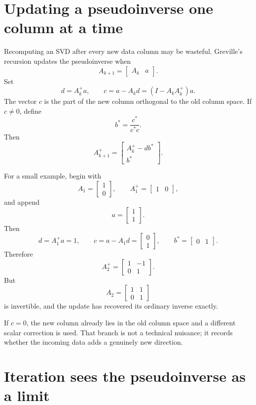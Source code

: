 \section{Updating a pseudoinverse one column at a time}

Recomputing an SVD after every new data column may be wasteful.  Greville's recursion updates the pseudoinverse when
\[
  A_{k+1}=\begin{bmatrix}A_k&a\end{bmatrix}.
\]
Set
\[
  d=A_k^+a,
  \qquad
  c=a-A_kd=(I-A_kA_k^+)a.
\]
The vector \(c\) is the part of the new column orthogonal to the old column space.  If \(c\ne0\), define
\[
  b^*=\frac{c^*}{c^*c}.
\]
Then
\[
  A_{k+1}^+
  =
  \begin{bmatrix}
    A_k^+-db^*\\
    b^*
  \end{bmatrix}.
\]

For a small example, begin with
\[
  A_1=
  \begin{bmatrix}1\\0\end{bmatrix},
  \qquad
  A_1^+=\begin{bmatrix}1&0\end{bmatrix},
\]
and append
\[
  a=
  \begin{bmatrix}1\\1\end{bmatrix}.
\]
Then
\[
  d=A_1^+a=1,
  \qquad
  c=a-A_1d=
  \begin{bmatrix}0\\1\end{bmatrix},
  \qquad
  b^*=\begin{bmatrix}0&1\end{bmatrix}.
\]
Therefore
\[
  A_2^+
  =
  \begin{bmatrix}
    1&-1\\
    0&1
  \end{bmatrix}.
\]
But
\[
  A_2=
  \begin{bmatrix}
    1&1\\
    0&1
  \end{bmatrix}
\]
is invertible, and the update has recovered its ordinary inverse exactly.

If \(c=0\), the new column already lies in the old column space and a different scalar correction is used.  That branch is not a technical nuisance; it records whether the incoming data adds a genuinely new direction.

\section{Iteration sees the pseudoinverse as a limit}

